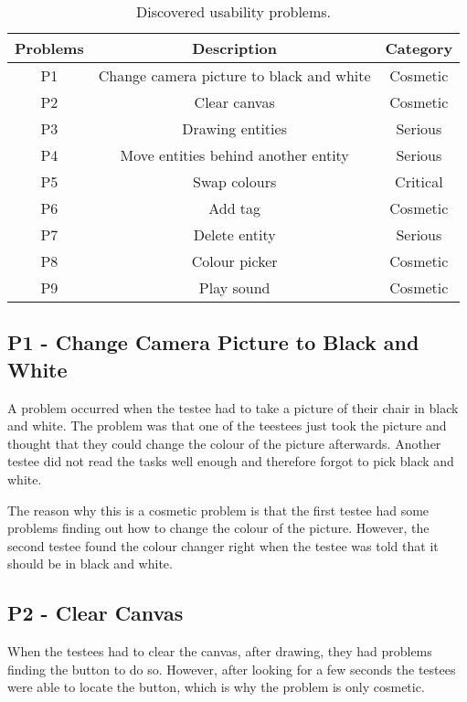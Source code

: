 \begin{table}[h]
	\centering 
	\begin{tabular}{|c|c|c|}
		\rowcolor{gray!50}
		\hline 
		Problems & Description & Category \\ 
		\hline
		P1 & Change camera picture to black and white & Cosmetic \\ 
 
		P2 & Clear canvas & Cosmetic \\ 
 
		P3 & Drawing entities & Serious \\ 

		P4 & Move entities behind another entity & Serious \\ 
 
		P5 & Swap colours & Critical \\ 
 
		P6 & Add tag & Cosmetic \\ 
 
		P7 & Delete entity & Serious \\ 
 
		P8 & Colour picker & Cosmetic \\ 
 
		P9 & Play sound & Cosmetic \\ 
		\hline 
	\end{tabular} 
	\caption{Discovered usability problems.}
	\label{tab:usability-problems}
\end{table}

\subsection*{P1 - Change Camera Picture to Black and White}
A problem occurred when the testee had to take a picture of their chair in black and white.
The problem was that one of the teestees just took the picture and thought that they could change the colour of the picture afterwards.
Another testee did not read the tasks well enough and therefore forgot to pick black and white.

The reason why this is a cosmetic problem is that the first testee had some problems finding out how to change the colour of the picture.
However, the second testee found the colour changer right when the testee was told that it should be in black and white.

\subsection*{P2 - Clear Canvas}
When the testees had to clear the canvas, after drawing, they had problems finding the button to do so.
However, after looking for a few seconds the testees were able to locate the button, which is why the problem is only cosmetic.

